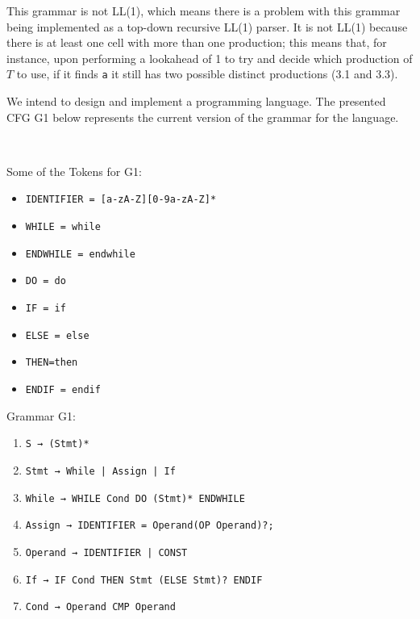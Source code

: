 \documentclass[docid=2017]{comp_test1}
\begin{document}
\ansseparator

\noindent
This grammar is not LL(1), which means there is a problem with this grammar being implemented as a top-down recursive LL(1) parser. It is not LL(1) because there is at least one cell with more than one production; this means that, for instance, upon performing a lookahead of 1 to try and decide which production of $T$ to use, if it finds \texttt{a} it still has two possible distinct productions (3.1 and 3.3).

We intend to design and implement a programming language. The presented CFG G1 below represents the current version of the grammar for the language.

~

\noindent
\begin{minipage}[t]{0.44\textwidth}
    Some of the Tokens for G1:
    
    \begin{itemize}[wide, noitemsep, label={}]
        \small
        \item \texttt{IDENTIFIER = [a-zA-Z][0-9a-zA-Z]*}
        \item \texttt{WHILE = while}
        \item \texttt{ENDWHILE = endwhile}
        \item \texttt{DO = do}
        \item \texttt{IF = if}
        \item \texttt{ELSE = else}
        \item \texttt{THEN=then}
        \item \texttt{ENDIF = endif}
    \end{itemize}
\end{minipage}
\begin{minipage}[t]{0.58\textwidth}
    Grammar G1:
    
    \begin{enumerate}
        \small
        \item \texttt{S → (Stmt)*}
        \item \texttt{Stmt → While | Assign | If}
        \item \texttt{While → WHILE Cond DO (Stmt)* ENDWHILE}
        \item \texttt{Assign → IDENTIFIER = Operand(OP Operand)?;}
        \item \texttt{Operand → IDENTIFIER | CONST}
        \item \texttt{If → IF Cond THEN Stmt (ELSE Stmt)? ENDIF}
        \item \texttt{Cond → Operand CMP Operand}
    \end{enumerate}
\end{minipage}
\end{document}
